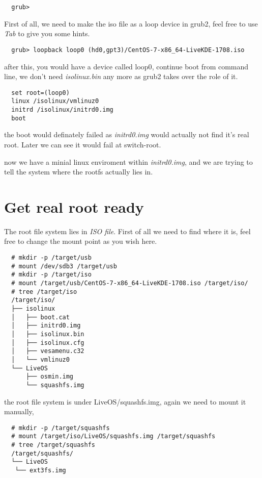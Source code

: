 \begin{lstlisting}
  grub> 
\end{lstlisting}

First of all, we need to make the iso file as a loop device in grub2, feel free to use \emph{Tab} to give you some hints. 
\begin{lstlisting}
  grub> loopback loop0 (hd0,gpt3)/CentOS-7-x86_64-LiveKDE-1708.iso
\end{lstlisting}
after this, you would have a device called {\ttfamily loop0}, continue boot from command line, we don't need \emph{isolinux.bin} any more as grub2 takes over the role of it.
\begin{lstlisting}
  set root=(loop0)
  linux /isolinux/vmlinuz0
  initrd /isolinux/initrd0.img
  boot
\end{lstlisting}
the boot would definately failed as \emph{initrd0.img} would actually not find it's real root. Later we can see it would fail at {\ttfamily switch-root}.

now we have a minial linux enviroment within \emph{initrd0.img}, and we are trying to tell the system where the rootfs actually lies in.

\section{Get real root ready}

The root file system lies in \emph{ISO file}. First of all we need to find where it is, feel free to change the mount point as you wish here. 

\begin{lstlisting}
  # mkdir -p /target/usb
  # mount /dev/sdb3 /target/usb
  # mkdir -p /target/iso
  # mount /target/usb/CentOS-7-x86_64-LiveKDE-1708.iso /target/iso/
  # tree /target/iso
  /target/iso/
  ├── isolinux
  │   ├── boot.cat
  │   ├── initrd0.img
  │   ├── isolinux.bin
  │   ├── isolinux.cfg
  │   ├── vesamenu.c32
  │   └── vmlinuz0
  └── LiveOS
      ├── osmin.img
      └── squashfs.img

\end{lstlisting}

the root file system is under {\ttfamily LiveOS/squashfs.img}, again we need to mount it manually,

\begin{lstlisting}
  # mkdir -p /target/squashfs
  # mount /target/iso/LiveOS/squashfs.img /target/squashfs
  # tree /target/squashfs
  /target/squashfs/
  └── LiveOS
   └── ext3fs.img
\end{lstlisting}


